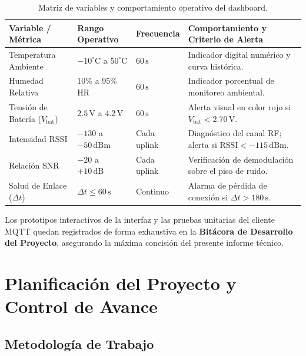 \documentclass[12pt,oneside,openany,spanish,oldfontcommands]{memoir}
\begin{document}
\begin{table}[H]
\centering
\small
\caption{Matriz de variables y comportamiento operativo del dashboard.}\label{tab:dashboard-kpis-diseno}
\begin{tabularx}{\textwidth}{>{\raggedright\arraybackslash}p{3.8cm} >{\centering\arraybackslash}p{2.6cm} >{\centering\arraybackslash}p{2.2cm} >{\raggedright\arraybackslash}X}
\toprule
\textbf{Variable / Métrica} & \textbf{Rango Operativo} & \textbf{Frecuencia} & \textbf{Comportamiento y Criterio de Alerta} \\
\midrule
Temperatura Ambiente & $-10^\circ\text{C}$ a $50^\circ\text{C}$ & $60\,\text{s}$ & Indicador digital numérico y curva histórica. \\
Humedad Relativa & $10\%$ a $95\%$ HR & $60\,\text{s}$ & Indicador porcentual de monitoreo ambiental. \\
Tensión de Batería ($V_{\text{bat}}$) & $2.5\,\text{V}$ a $4.2\,\text{V}$ & $60\,\text{s}$ & Alerta visual en color rojo si $V_{\text{bat}} < 2.70\,\text{V}$. \\
Intensidad RSSI & $-130$ a $-50\,\text{dBm}$ & Cada uplink & Diagnóstico del canal RF; alerta si $\text{RSSI} < -115\,\text{dBm}$. \\
Relación SNR & $-20$ a $+10\,\text{dB}$ & Cada uplink & Verificación de demodulación sobre el piso de ruido. \\
Salud de Enlace ($\Delta t$) & $\Delta t \le 60\,\text{s}$ & Continuo & Alarma de pérdida de conexión si $\Delta t > 180\,\text{s}$. \\
\bottomrule
\end{tabularx}
\end{table}

Los prototipos interactivos de la interfaz y las pruebas unitarias del cliente MQTT quedan
registrados de forma exhaustiva en la \textbf{Bitácora de Desarrollo del Proyecto}, asegurando
la máxima concisión del presente informe técnico.

\chapter{Planificación del Proyecto y Control de Avance}\label{cap:planificacion}

\section{Metodología de Trabajo}
\end{document}
